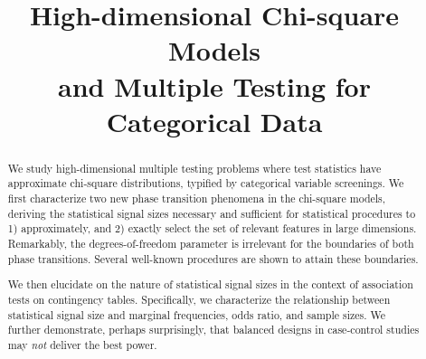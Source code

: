 \documentclass[ejs]{imsart}
\numberwithin{equation}{section}
\theoremstyle{plain}
\theoremstyle{remark}
\begin{document}
\begin{frontmatter}
\title{High-dimensional Chi-square Models \\
  \smaller{}and Multiple Testing for Categorical Data} %

\begin{aug}
\author{ }

\address{Department of Statistics, University of Michigan, Ann Arbor, USA\\
}



\end{aug}

\begin{abstract}
We study high-dimensional multiple testing problems where test statistics have approximate chi-square distributions, typified by categorical variable screenings.
We first characterize two new phase transition phenomena in the chi-square models, deriving the statistical signal sizes necessary and sufficient for statistical procedures to 1) approximately, and 2) exactly select the set of relevant features in large dimensions.
Remarkably, the degrees-of-freedom parameter is irrelevant for the boundaries of both phase transitions.
Several well-known procedures are shown to attain these boundaries.

We then elucidate on the nature of statistical signal sizes in the context of association tests on contingency tables. 
Specifically, we characterize the relationship between statistical signal size and marginal frequencies, odds ratio, and sample sizes. %
We further demonstrate, perhaps surprisingly, that balanced designs in case-control studies may \emph{not} deliver the best power. %


\end{abstract}
\end{frontmatter}
\end{document}
